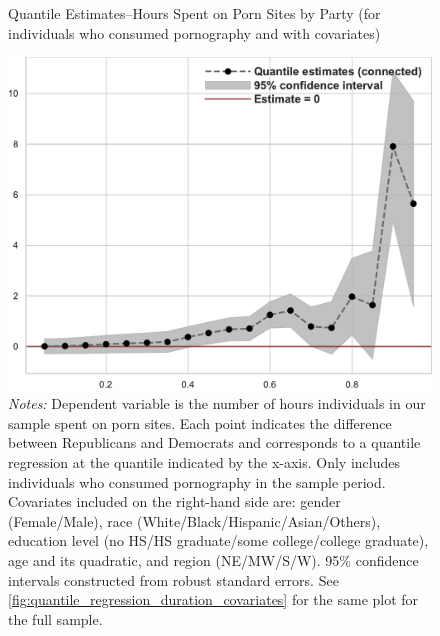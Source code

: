 \documentclass[12pt, letterpaper]{article}
\begin{document}
\begin{figure}[ht]
	\centering
	\caption{Quantile Estimates--Hours Spent on Porn Sites by Party (for individuals who consumed pornography and with covariates)}
	\includegraphics[width=.55\linewidth]{../figs/quantile_reg_nonzero_covariates_duration_adult.pdf}
	\caption*{\footnotesize \emph{Notes:} 
		Dependent variable is the number of hours individuals in our sample spent on porn sites.
		Each point indicates the difference between Republicans and Democrats and corresponds to a quantile regression at the quantile indicated by the x-axis.
		Only includes individuals who consumed pornography in the sample period.
		Covariates included on the right-hand side are: gender (Female/Male), race (White/Black/Hispanic/Asian/Others), education level (no HS/HS graduate/some college/college graduate), age and its quadratic, and region (NE/MW/S/W).
		95\% confidence intervals constructed from robust standard errors.
		See \cref{fig:quantile_regression_duration_covariates} for the same plot for the full sample.
	}
	\label{fig:quantile_regression_duration_nonzeroes_covariates}
\end{figure}
\end{document}
